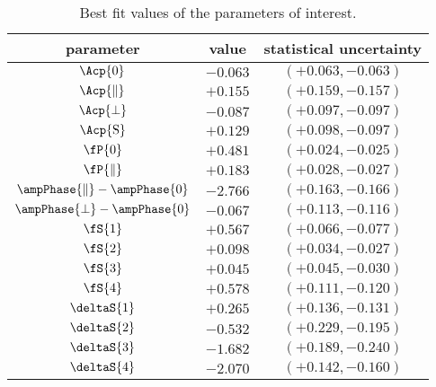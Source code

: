 \begin{table}[!h]
  \center
  \begin{tabular}{c c c}
    \hline
     parameter & value & statistical uncertainty \\
     \hline
     $             \Acp{0}$ & $-0.063$ & $(+0.063,-0.063)$ \\
     $     \Acp{\parallel}$ & $+0.155$ & $(+0.159,-0.157)$ \\
     $         \Acp{\perp}$ & $-0.087$ & $(+0.097,-0.097)$ \\
     $             \Acp{\rm S}$ & $+0.129$ & $(+0.098,-0.097)$ \\
     \hline
     $              \fP{0}$ & $+0.481$ & $(+0.024,-0.025)$ \\
     $      \fP{\parallel}$ & $+0.183$ & $(+0.028,-0.027)$ \\
     $\ampPhase{\parallel}-\ampPhase{0}$ & $-2.766$ & $(+0.163,-0.166)$ \\
     $    \ampPhase{\perp}-\ampPhase{0}$ & $-0.067$ & $(+0.113,-0.116)$ \\
     \hline
     $              \fS{1}$ & $+0.567$ & $(+0.066,-0.077)$ \\
     $              \fS{2}$ & $+0.098$ & $(+0.034,-0.027)$ \\
     $              \fS{3}$ & $+0.045$ & $(+0.045,-0.030)$ \\
     $              \fS{4}$ & $+0.578$ & $(+0.111,-0.120)$ \\
     $          \deltaS{1}$ & $+0.265$ & $(+0.136,-0.131)$ \\
     $          \deltaS{2}$ & $-0.532$ & $(+0.229,-0.195)$ \\
     $          \deltaS{3}$ & $-1.682$ & $(+0.189,-0.240)$ \\
     $          \deltaS{4}$ & $-2.070$ & $(+0.142,-0.160)$ \\
    \hline
  \end{tabular}
  \caption{\small Best fit values of the parameters of interest.}
  \label{bestFitResult}
\end{table}

